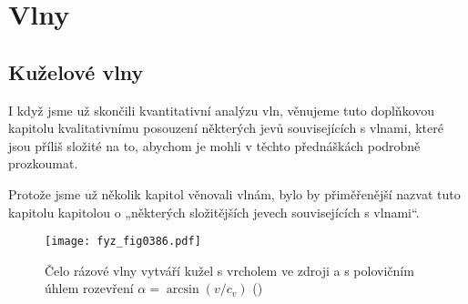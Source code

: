 \setchaptertoc
\chapter{Vlny}\label{fyz:IchapLI}

\section{Kuželové vlny}\label{fyz:IchapLIsecI}
  I když jsme už skončili kvantitativní analýzu vln, věnujeme tuto doplňkovou kapitolu 
  kvalitativnímu posouzení některých jevů souvisejících s vlnami, které jsou příliš složité na to, 
  abychom je mohli v těchto přednáškách podrobně prozkoumat.
  
  Protože jsme už několik kapitol věnovali vlnám, bylo by přiměřenější nazvat tuto kapitolu 
  kapitolou o „některých složitějších jevech souvisejících s vlnami“.
  
  \begin{figure}[ht!] %
    \centering
    \texttt{[image: fyz\_fig0386.pdf]}
    \caption{Čelo rázové vlny vytváří kužel s vrcholem ve zdroji a s polovičním úhlem rozevření
             \(\alpha =\arcsin(v/c_v)\)
             (\cite[s.~686]{Feynman01})}
    \label{fyz:fig0386}
  \end{figure}

